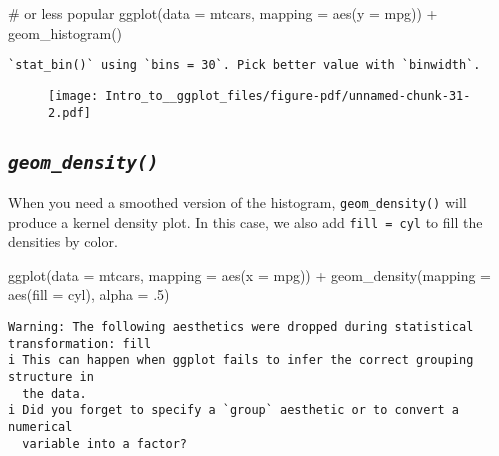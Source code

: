 \documentclass[
  letterpaper,
  DIV=11,
  numbers=noendperiod]{scrartcl}
\newenvironment{Shaded}{\begin{snugshade}}{\end{snugshade}}
\newcommand{\AttributeTok}[1]{\textcolor[rgb]{0.40,0.45,0.13}{#1}}
\newcommand{\CommentTok}[1]{\textcolor[rgb]{0.37,0.37,0.37}{#1}}
\newcommand{\DecValTok}[1]{\textcolor[rgb]{0.68,0.00,0.00}{#1}}
\newcommand{\FunctionTok}[1]{\textcolor[rgb]{0.28,0.35,0.67}{#1}}
\newcommand{\NormalTok}[1]{\textcolor[rgb]{0.00,0.23,0.31}{#1}}
\newcommand{\SpecialCharTok}[1]{\textcolor[rgb]{0.37,0.37,0.37}{#1}}
\begin{document}
\begin{Shaded}
\begin{Highlighting}[]
\CommentTok{\# or less popular}
\FunctionTok{ggplot}\NormalTok{(}\AttributeTok{data =}\NormalTok{ mtcars, }
       \AttributeTok{mapping =} \FunctionTok{aes}\NormalTok{(}\AttributeTok{y =}\NormalTok{ mpg)) }\SpecialCharTok{+}
  \FunctionTok{geom\_histogram}\NormalTok{()}
\end{Highlighting}
\end{Shaded}

\begin{verbatim}
`stat_bin()` using `bins = 30`. Pick better value with `binwidth`.
\end{verbatim}

\begin{figure}[H]

{\centering \texttt{[image: Intro\_to\_\_ggplot\_files/figure-pdf/unnamed-chunk-31-2.pdf]}

}

\end{figure}

\hypertarget{geom_density}{%
\subsection{\texorpdfstring{\emph{\texttt{geom\_density()}}}{geom\_density()}}\label{geom_density}}

When you need a smoothed version of the histogram,
\texttt{geom\_density()} will produce a kernel density plot. In this
case, we also add \texttt{fill\ =\ cyl} to fill the densities by color.

\begin{Shaded}
\begin{Highlighting}[]
\FunctionTok{ggplot}\NormalTok{(}\AttributeTok{data =}\NormalTok{ mtcars, }
       \AttributeTok{mapping =} \FunctionTok{aes}\NormalTok{(}\AttributeTok{x =}\NormalTok{ mpg)) }\SpecialCharTok{+}
  \FunctionTok{geom\_density}\NormalTok{(}\AttributeTok{mapping =} \FunctionTok{aes}\NormalTok{(}\AttributeTok{fill =}\NormalTok{ cyl), }
               \AttributeTok{alpha =}\NormalTok{ .}\DecValTok{5}\NormalTok{)}
\end{Highlighting}
\end{Shaded}

\begin{verbatim}
Warning: The following aesthetics were dropped during statistical transformation: fill
i This can happen when ggplot fails to infer the correct grouping structure in
  the data.
i Did you forget to specify a `group` aesthetic or to convert a numerical
  variable into a factor?
\end{verbatim}
\end{document}
